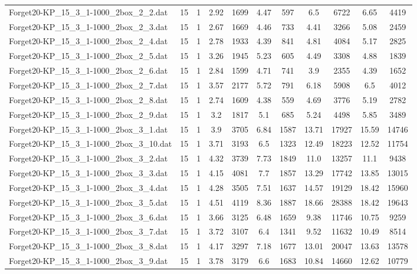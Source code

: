 \begin{table}[!ht]
\begin{tabular}{lcccccccccc}
Forget20-KP\_15\_3\_1-1000\_2box\_2\_2.dat & 15 & 1 & 2.92 & 1699 & 4.47 & 597 & 6.5 & 6722 & 6.65 & 4419 \\
Forget20-KP\_15\_3\_1-1000\_2box\_2\_3.dat & 15 & 1 & 2.67 & 1669 & 4.46 & 733 & 4.41 & 3266 & 5.08 & 2459 \\
Forget20-KP\_15\_3\_1-1000\_2box\_2\_4.dat & 15 & 1 & 2.78 & 1933 & 4.39 & 841 & 4.81 & 4084 & 5.17 & 2825 \\
Forget20-KP\_15\_3\_1-1000\_2box\_2\_5.dat & 15 & 1 & 3.26 & 1945 & 5.23 & 605 & 4.49 & 3308 & 4.88 & 1839 \\
Forget20-KP\_15\_3\_1-1000\_2box\_2\_6.dat & 15 & 1 & 2.84 & 1599 & 4.71 & 741 & 3.9 & 2355 & 4.39 & 1652 \\
Forget20-KP\_15\_3\_1-1000\_2box\_2\_7.dat & 15 & 1 & 3.57 & 2177 & 5.72 & 791 & 6.18 & 5908 & 6.5 & 4012 \\
Forget20-KP\_15\_3\_1-1000\_2box\_2\_8.dat & 15 & 1 & 2.74 & 1609 & 4.38 & 559 & 4.69 & 3776 & 5.19 & 2782 \\
Forget20-KP\_15\_3\_1-1000\_2box\_2\_9.dat & 15 & 1 & 3.2 & 1817 & 5.1 & 685 & 5.24 & 4498 & 5.85 & 3489 \\
Forget20-KP\_15\_3\_1-1000\_2box\_3\_1.dat & 15 & 1 & 3.9 & 3705 & 6.84 & 1587 & 13.71 & 17927 & 15.59 & 14746 \\
Forget20-KP\_15\_3\_1-1000\_2box\_3\_10.dat & 15 & 1 & 3.71 & 3193 & 6.5 & 1323 & 12.49 & 18223 & 12.52 & 11754 \\
Forget20-KP\_15\_3\_1-1000\_2box\_3\_2.dat & 15 & 1 & 4.32 & 3739 & 7.73 & 1849 & 11.0 & 13257 & 11.1 & 9438 \\
Forget20-KP\_15\_3\_1-1000\_2box\_3\_3.dat & 15 & 1 & 4.15 & 4081 & 7.7 & 1857 & 13.29 & 17742 & 13.85 & 13015 \\
Forget20-KP\_15\_3\_1-1000\_2box\_3\_4.dat & 15 & 1 & 4.28 & 3505 & 7.51 & 1637 & 14.57 & 19129 & 18.42 & 15960 \\
Forget20-KP\_15\_3\_1-1000\_2box\_3\_5.dat & 15 & 1 & 4.51 & 4119 & 8.36 & 1887 & 18.66 & 28388 & 18.42 & 19643 \\
Forget20-KP\_15\_3\_1-1000\_2box\_3\_6.dat & 15 & 1 & 3.66 & 3125 & 6.48 & 1659 & 9.38 & 11746 & 10.75 & 9259 \\
Forget20-KP\_15\_3\_1-1000\_2box\_3\_7.dat & 15 & 1 & 3.72 & 3107 & 6.4 & 1341 & 9.52 & 11632 & 10.49 & 8514 \\
Forget20-KP\_15\_3\_1-1000\_2box\_3\_8.dat & 15 & 1 & 4.17 & 3297 & 7.18 & 1677 & 13.01 & 20047 & 13.63 & 13578 \\
Forget20-KP\_15\_3\_1-1000\_2box\_3\_9.dat & 15 & 1 & 3.78 & 3179 & 6.6 & 1683 & 10.84 & 14660 & 12.62 & 10779 \\

\end{tabular}
\end{table}
